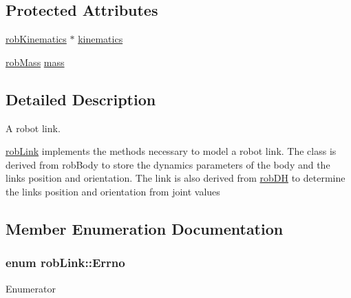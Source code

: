 \subsection*{Protected Attributes}
\begin{DoxyCompactItemize}
\item 
\hyperlink{classrob_kinematics}{rob\+Kinematics} $\ast$ \hyperlink{classrob_link_a4aa26f90307b406c336f9b7fae00b905}{kinematics}
\item 
\hyperlink{classrob_mass}{rob\+Mass} \hyperlink{classrob_link_a7b524ebf9d101bc369749585db1ba66d}{mass}
\end{DoxyCompactItemize}


\subsection{Detailed Description}
A robot link. 

\hyperlink{classrob_link}{rob\+Link} implements the methods necessary to model a robot link. The class is derived from rob\+Body to store the dynamics parameters of the body and the link\textquotesingle{}s position and orientation. The link is also derived from \hyperlink{classrob_d_h}{rob\+D\+H} to determine the link\textquotesingle{}s position and orientation from joint values 

\subsection{Member Enumeration Documentation}
\hypertarget{classrob_link_aeafaa7aaa6cb47af0db3b746606c0bd0}{}
\subsubsection[{Errno}]{\setlength{\rightskip}{0pt plus 5cm}enum {\bf rob\+Link\+::\+Errno}}\label{classrob_link_aeafaa7aaa6cb47af0db3b746606c0bd0}
\begin{Desc}
\item[Enumerator]\par
\begin{description}
\item[{\em 
\hypertarget{classrob_link_aeafaa7aaa6cb47af0db3b746606c0bd0a50ca3684acd35bf81c30fbb7d9fe5652}{}E\+S\+U\+C\+C\+E\+S\+S\label{classrob_link_aeafaa7aaa6cb47af0db3b746606c0bd0a50ca3684acd35bf81c30fbb7d9fe5652}
}]\item[{\em 
\hypertarget{classrob_link_aeafaa7aaa6cb47af0db3b746606c0bd0a0506973f35ceab0b466f40856a327ca7}{}E\+F\+A\+I\+L\+U\+R\+E\label{classrob_link_aeafaa7aaa6cb47af0db3b746606c0bd0a0506973f35ceab0b466f40856a327ca7}
}]\end{description}
\end{Desc}


